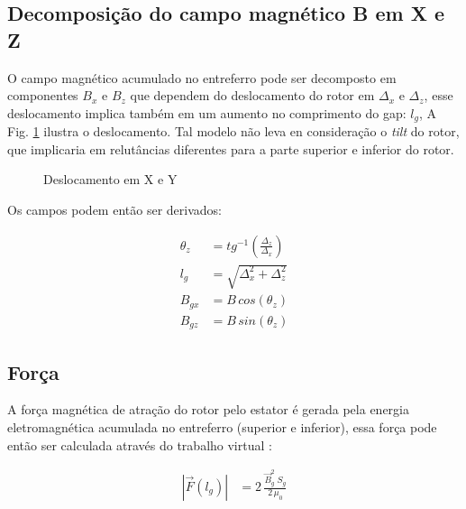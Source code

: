 %


\subsection{Decomposição do campo magnético B em X e Z} \label{SubSec:CampoX/Y}

O campo magnético acumulado no entreferro pode ser decomposto em componentes $B_x$ e $B_z$ que dependem do deslocamento do rotor em $\Delta_x$ e $\Delta_z$, esse deslocamento implica também em um aumento no comprimento do gap: $l_g$, A Fig. \ref{Fig:modelo:passivo:DxDz} ilustra o deslocamento. Tal modelo não leva en consideração o \textit{tilt} do rotor, que implicaria em relutâncias diferentes para a parte superior e inferior do rotor. 

	\begin{figure}[!ht]
		\centering
		\def\svgwidth{0.6\columnwidth}
		
			\caption{Deslocamento em X e Y}
			\label{Fig:modelo:passivo:DxDz}
	\end{figure}

 Os campos podem então ser derivados:
 
 \begin{align}
 	\theta_z &= tg^{-1}(\frac{\Delta_z}{\Delta_x}) \\
 	l_g &= \sqrt{\Delta_x^2 + \Delta_z^2} \\
 	B_{gx} &= B \, cos(\theta_z) \\
 	B_{gz} &= B \, sin(\theta_z) 
 \end{align}


\subsection{Força}

A força magnética de atração do rotor pelo estator é gerada pela energia eletromagnética acumulada no entreferro (superior e inferior), essa força pode então ser calculada através do trabalho virtual \citep{Chiba}:

\begin{align}
	|\vec{F}(l_g)| &= 2 \, \frac{ \vec{B}_{g}^2 \; S_g}{2 \, \mu_0} \label{eq:passivo:Fx}
\end{align}

